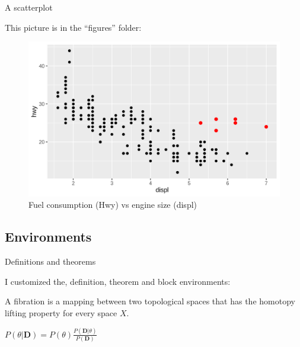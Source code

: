 
\begin{frame}{A scatterplot}

This picture is in the ``figures'' folder:

\begin{figure}
\includegraphics[scale=.5]{figures/graph.png}
\caption{Fuel consumption (Hwy) vs engine size (displ)}
\end{figure}

\end{frame}

\subsection{Environments}


\begin{frame}{Definitions and theorems}

I customized the, definition, theorem and block environments:

\begin{definition}[Fibration]
A fibration is a mapping between two topological spaces that has the homotopy lifting property for every space $X$.
\end{definition}

\begin{theorem}[Bayes]
$P(\theta|\textbf{D}) = P(\theta ) \frac{P(\textbf{D} |\theta)}{P(\textbf{D})}$
\end{theorem}

\end{frame}


